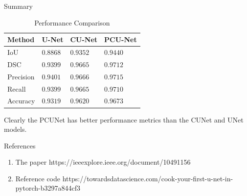 \documentclass{beamer}
\begin{document}
\begin{frame}{Summary}
    \begin{table}[htbp]
        \centering
        \label{tab:performance}
        \begin{tabular}{|l|l|l|l|}
        \hline
        \textbf{Method} & \textbf{U-Net} & \textbf{CU-Net} & \textbf{PCU-Net} \\ \hline
        IoU              & $0.8868$ & $0.9352$ & $0.9440$ \\ \hline
        DSC              & $0.9399$ & $0.9665$ & $0.9712$ \\ \hline
        Precision        & $0.9401$ & $0.9666$ & $0.9715$ \\ \hline
        Recall           & $0.9399$ & $0.9665$ & $0.9710$ \\ \hline
        Accuracy         & $0.9319$ & $0.9620$ & $0.9673$ \\ \hline
        \end{tabular}
        \caption{Performance Comparison}

        \end{table}
        Clearly the PCUNet has better performance metrics than the CUNet and UNet models.
\end{frame}
\begin{frame}{References}
    \begin{enumerate}
        \item The paper https://ieeexplore.ieee.org/document/10491156
        \item Reference code https://towardsdatascience.com/cook-your-first-u-net-in-pytorch-b3297a844cf3
    \end{enumerate}
\end{frame}
\end{document}
